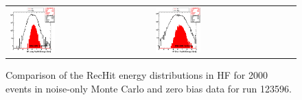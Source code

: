 \begin{figure}[h!]
 \centering
 \begin{tabular}{ll}
  \includegraphics[width=0.33\textwidth]{plots_CaloNoise/h_RecHitEinHFl.eps} &
  \includegraphics[width=0.33\textwidth]{plots_CaloNoise/h_RecHitEinHFs.eps} \\
 \end{tabular}
 \caption{\small Comparison of the RecHit energy distributions in HF for 2000 events in noise-only Monte Carlo
          and zero bias data for run 123596.\label{fig:RecHitE}}
\end{figure}